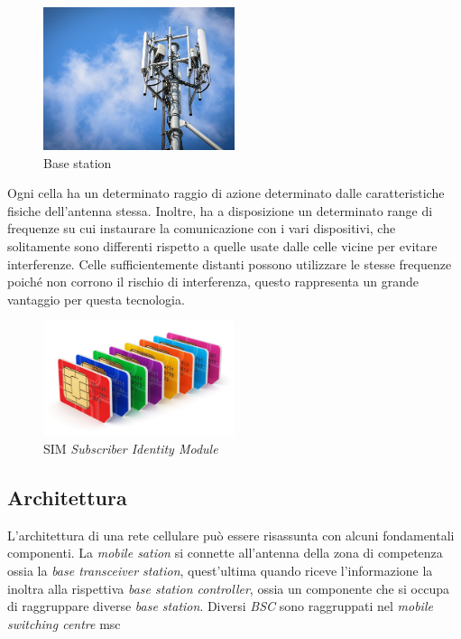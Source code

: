 \begin{figure}[h]
    \centering
    \includegraphics[width=0.5\textwidth]{images/base-station.jpg}
    \caption{Base station}
\end{figure}
Ogni cella ha un determinato raggio di azione determinato dalle caratteristiche fisiche dell'antenna stessa. Inoltre, 
ha a disposizione un determinato range di frequenze su cui instaurare la comunicazione con i vari dispositivi, che solitamente
sono differenti rispetto a quelle usate dalle celle vicine per evitare interferenze.
Celle sufficientemente distanti possono utilizzare le stesse frequenze poiché non corrono il rischio di interferenza, questo rappresenta
un grande vantaggio per questa tecnologia.
\begin{figure}[h]
    \centering
    \includegraphics[width=0.5\textwidth]{images/simcard.jpg}
    \caption{SIM \textit{Subscriber Identity Module}}
\end{figure}

\subsection{Architettura}
L'architettura di una rete cellulare può essere risassunta con alcuni fondamentali componenti. La \textit{mobile sation} si connette all'antenna
della zona di competenza ossia la \textit{base transceiver station}, quest'ultima quando riceve l'informazione la inoltra alla rispettiva \textit{base station controller}, ossia
un componente che si occupa di raggruppare diverse \textit{base station}. 
Diversi \textit{BSC} sono raggruppati nel \textit{mobile switching centre} \gls{msc}